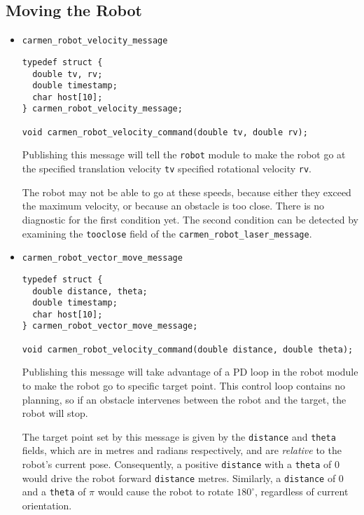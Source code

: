 \documentclass{article}
\begin{document}
\subsection{Moving the Robot}

\begin{itemize}

\item \verb!carmen_robot_velocity_message!

\begin{verbatim}
typedef struct {
  double tv, rv;
  double timestamp;
  char host[10];
} carmen_robot_velocity_message;

void carmen_robot_velocity_command(double tv, double rv);
\end{verbatim}

Publishing this message will tell the \verb!robot! module to make the robot go
at the specified translation velocity \verb!tv! specified rotational velocity
\verb!rv!.

The robot may not be able to go at these speeds, because either they exceed
the maximum velocity, or because an obstacle is too close. There is no
diagnostic for the first condition yet. The second condition can be detected
by examining the \verb!tooclose! field of the
\verb!carmen_robot_laser_message!.

\item \verb!carmen_robot_vector_move_message!

\begin{verbatim}
typedef struct {
  double distance, theta;
  double timestamp;
  char host[10];
} carmen_robot_vector_move_message;

void carmen_robot_velocity_command(double distance, double theta);
\end{verbatim}

Publishing this message will take advantage of a PD loop in the robot module
to make the robot go to specific target point. This control loop contains no
planning, so if an obstacle intervenes between the robot and the target, the
robot will stop. 

The target point set by this message is given by the \verb!distance! and
\verb!theta! fields, which are in metres and radians respectively, and are
\emph{relative} to the robot's current pose. Consequently, a positive
\verb!distance! with a \verb!theta! of 0 would drive the robot forward
\verb!distance! metres. Similarly, a \verb!distance! of 0 and a \verb!theta! 
of $\pi$ would cause the robot to rotate $180^\circ$, regardless of current
orientation. 

\end{itemize}
\end{document}
